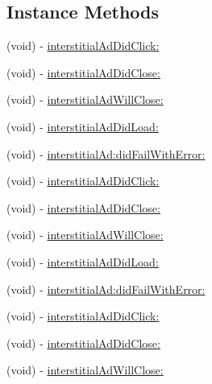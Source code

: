 \subsection*{Instance Methods}
\begin{DoxyCompactItemize}
\item 
(void) -\/ \hyperlink{protocolFBInterstitialAdDelegate_01-p_a03799a3b2c114c7169b0cb1cf7c81132}{interstitial\+Ad\+Did\+Click\+:}
\item 
(void) -\/ \hyperlink{protocolFBInterstitialAdDelegate_01-p_a764df2f13294f6db329aad7e96b99da1}{interstitial\+Ad\+Did\+Close\+:}
\item 
(void) -\/ \hyperlink{protocolFBInterstitialAdDelegate_01-p_a9552e934440e2bbb01f09b7eb2e3a5a3}{interstitial\+Ad\+Will\+Close\+:}
\item 
(void) -\/ \hyperlink{protocolFBInterstitialAdDelegate_01-p_a6e42af81b5d6382056651aee8b71c720}{interstitial\+Ad\+Did\+Load\+:}
\item 
(void) -\/ \hyperlink{protocolFBInterstitialAdDelegate_01-p_a55d38d3ba346d2251fe10cec24023da7}{interstitial\+Ad\+:did\+Fail\+With\+Error\+:}
\item 
(void) -\/ \hyperlink{protocolFBInterstitialAdDelegate_01-p_a03799a3b2c114c7169b0cb1cf7c81132}{interstitial\+Ad\+Did\+Click\+:}
\item 
(void) -\/ \hyperlink{protocolFBInterstitialAdDelegate_01-p_a764df2f13294f6db329aad7e96b99da1}{interstitial\+Ad\+Did\+Close\+:}
\item 
(void) -\/ \hyperlink{protocolFBInterstitialAdDelegate_01-p_a9552e934440e2bbb01f09b7eb2e3a5a3}{interstitial\+Ad\+Will\+Close\+:}
\item 
(void) -\/ \hyperlink{protocolFBInterstitialAdDelegate_01-p_a6e42af81b5d6382056651aee8b71c720}{interstitial\+Ad\+Did\+Load\+:}
\item 
(void) -\/ \hyperlink{protocolFBInterstitialAdDelegate_01-p_a55d38d3ba346d2251fe10cec24023da7}{interstitial\+Ad\+:did\+Fail\+With\+Error\+:}
\item 
(void) -\/ \hyperlink{protocolFBInterstitialAdDelegate_01-p_a03799a3b2c114c7169b0cb1cf7c81132}{interstitial\+Ad\+Did\+Click\+:}
\item 
(void) -\/ \hyperlink{protocolFBInterstitialAdDelegate_01-p_a764df2f13294f6db329aad7e96b99da1}{interstitial\+Ad\+Did\+Close\+:}
\item 
(void) -\/ \hyperlink{protocolFBInterstitialAdDelegate_01-p_a9552e934440e2bbb01f09b7eb2e3a5a3}{interstitial\+Ad\+Will\+Close\+:}
\item 

\end{DoxyCompactItemize}
